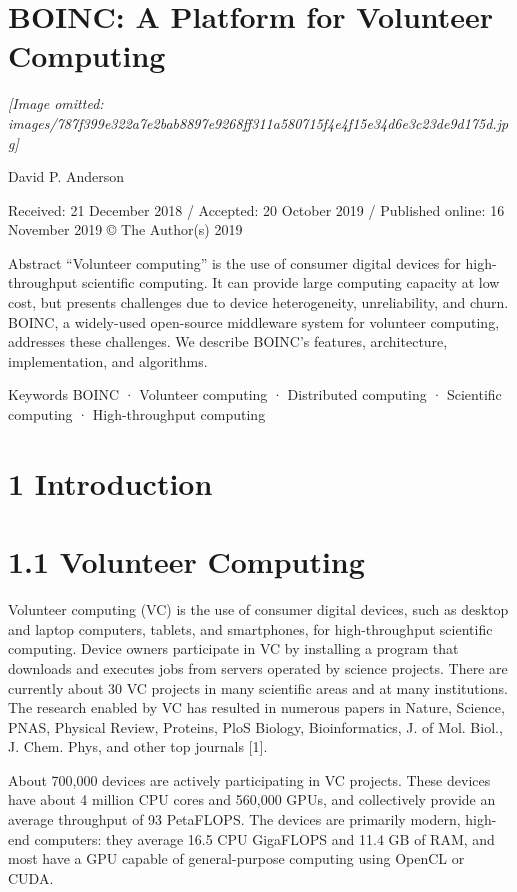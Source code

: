 \documentclass[
]{article}
\author{}
\date{}
\begin{document}
\section{BOINC: A Platform for Volunteer
Computing}\label{boinc-a-platform-for-volunteer-computing}

\textit{[Image omitted: images/787f399e322a7e2bab8897e9268ff311a580715f4e4f15e34d6e3c23de9d175d.jpg]}

David P. Anderson

Received: 21 December 2018 / Accepted: 20 October 2019 / Published
online: 16 November 2019 © The Author(s) 2019

Abstract ``Volunteer computing'' is the use of consumer digital devices
for high-throughput scientific computing. It can provide large computing
capacity at low cost, but presents challenges due to device
heterogeneity, unreliability, and churn. BOINC, a widely-used
open-source middleware system for volunteer computing, addresses these
challenges. We describe BOINC's features, architecture, implementation,
and algorithms.

Keywords BOINC · Volunteer computing · Distributed computing ·
Scientific computing · High-throughput computing

\section{1 Introduction}\label{introduction}

\section{1.1 Volunteer Computing}\label{volunteer-computing}

Volunteer computing (VC) is the use of consumer digital devices, such as
desktop and laptop computers, tablets, and smartphones, for
high-throughput scientific computing. Device owners participate in VC by
installing a program that downloads and executes jobs from servers
operated by science projects. There are currently about 30 VC projects
in many scientific areas and at many institutions. The research enabled
by VC has resulted in numerous papers in Nature, Science, PNAS, Physical
Review, Proteins, PloS Biology, Bioinformatics, J. of Mol. Biol., J.
Chem. Phys, and other top journals {[}1{]}.

About 700,000 devices are actively participating in VC projects. These
devices have about 4 million CPU cores and 560,000 GPUs, and
collectively provide an average throughput of 93 PetaFLOPS. The devices
are primarily modern, high-end computers: they average 16.5 CPU
GigaFLOPS and 11.4 GB of RAM, and most have a GPU capable of
general-purpose computing using OpenCL or CUDA.
\end{document}
